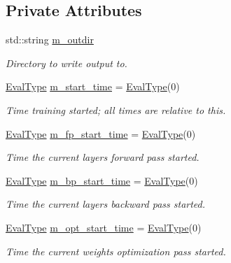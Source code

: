 \subsection*{Private Attributes}
\begin{DoxyCompactItemize}
\item 
std\+::string \hyperlink{classlbann_1_1lbann__callback__timeline_afb064216a569f0763b2fff4ab5547790}{m\+\_\+outdir}
\begin{DoxyCompactList}\small\item\em Directory to write output to. \end{DoxyCompactList}\item 
\hyperlink{base_8hpp_a3266f5ac18504bbadea983c109566867}{Eval\+Type} \hyperlink{classlbann_1_1lbann__callback__timeline_a624a9b00735fb7644d544ec6ed83dd27}{m\+\_\+start\+\_\+time} = \hyperlink{base_8hpp_a3266f5ac18504bbadea983c109566867}{Eval\+Type}(0)
\begin{DoxyCompactList}\small\item\em Time training started; all times are relative to this. \end{DoxyCompactList}\item 
\hyperlink{base_8hpp_a3266f5ac18504bbadea983c109566867}{Eval\+Type} \hyperlink{classlbann_1_1lbann__callback__timeline_a5c24aa919edfcd34fce577ef17e9153f}{m\+\_\+fp\+\_\+start\+\_\+time} = \hyperlink{base_8hpp_a3266f5ac18504bbadea983c109566867}{Eval\+Type}(0)
\begin{DoxyCompactList}\small\item\em Time the current layer\textquotesingle{}s forward pass started. \end{DoxyCompactList}\item 
\hyperlink{base_8hpp_a3266f5ac18504bbadea983c109566867}{Eval\+Type} \hyperlink{classlbann_1_1lbann__callback__timeline_a7c4383231990d3a5fc8ec22a93784e15}{m\+\_\+bp\+\_\+start\+\_\+time} = \hyperlink{base_8hpp_a3266f5ac18504bbadea983c109566867}{Eval\+Type}(0)
\begin{DoxyCompactList}\small\item\em Time the current layer\textquotesingle{}s backward pass started. \end{DoxyCompactList}\item 
\hyperlink{base_8hpp_a3266f5ac18504bbadea983c109566867}{Eval\+Type} \hyperlink{classlbann_1_1lbann__callback__timeline_a9f16bbedce47953a28e63b52d92792c3}{m\+\_\+opt\+\_\+start\+\_\+time} = \hyperlink{base_8hpp_a3266f5ac18504bbadea983c109566867}{Eval\+Type}(0)
\begin{DoxyCompactList}\small\item\em Time the current weights\textquotesingle{} optimization pass started. \end{DoxyCompactList}\item 

\end{DoxyCompactItemize}
